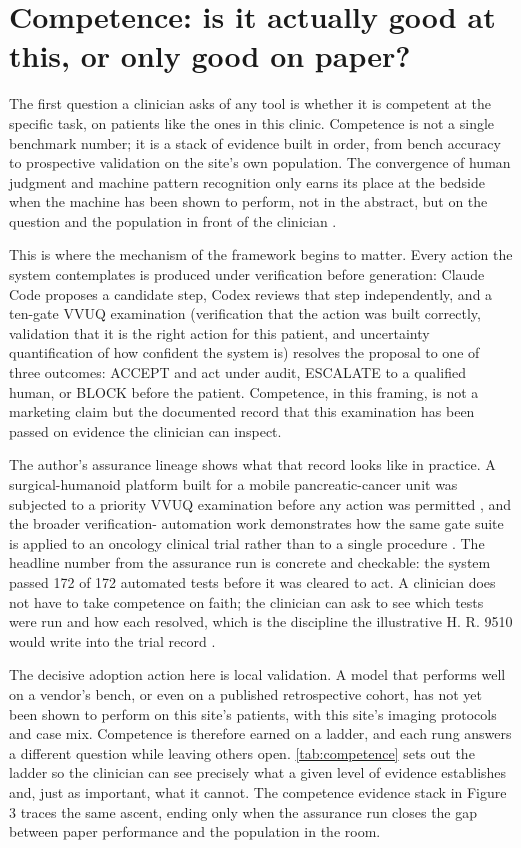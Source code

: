 \section{Competence: is it actually good at this, or only good on paper?}
\label{sec:competence}

The first question a clinician asks of any tool is whether it is competent at the
specific task, on patients like the ones in this clinic. Competence is not a single
benchmark number; it is a stack of evidence built in order, from bench accuracy to
prospective validation on the site's own population. The convergence of human
judgment and machine pattern recognition only earns its place at the bedside when
the machine has been shown to perform, not in the abstract, but on the question and
the population in front of the clinician \cite{topol2019high}.

This is where the mechanism of the framework begins to matter. Every action the
system contemplates is produced under verification before generation: Claude Code
proposes a candidate step, Codex reviews that step independently, and a ten-gate
VVUQ examination (verification that the action was built correctly, validation that
it is the right action for this patient, and uncertainty quantification of how
confident the system is) resolves the proposal to one of three outcomes: ACCEPT
and act under audit, ESCALATE to a qualified human, or BLOCK before the patient.
Competence, in this framing, is not a marketing claim but the documented record
that this examination has been passed on evidence the clinician can inspect.

The author's assurance lineage shows what that record looks like in practice. A
surgical-humanoid platform built for a mobile pancreatic-cancer unit was subjected
to a priority VVUQ examination before any action was permitted
\cite{Kawchak2026MobilePancreaticCancerUnitree}, and the broader verification-
automation work demonstrates how the same gate suite is applied to an oncology
clinical trial rather than to a single procedure
\cite{Kawchak2026VVUQOncologyClinicalTrial}. The headline number from the assurance
run is concrete and checkable: the system passed 172 of 172 automated tests before
it was cleared to act. A clinician does not have to take competence on faith; the
clinician can ask to see which tests were run and how each resolved, which is the
discipline the illustrative H. R. 9510 would write into the trial record
\cite{Kawchak2026HR9510Bill}.

The decisive adoption action here is local validation. A model that performs well
on a vendor's bench, or even on a published retrospective cohort, has not yet been
shown to perform on this site's patients, with this site's imaging protocols and
case mix. Competence is therefore earned on a ladder, and each rung answers a
different question while leaving others open. \autoref{tab:competence} sets out the
ladder so the clinician can see precisely what a given level of evidence
establishes and, just as important, what it cannot. The competence evidence stack
in Figure 3 traces the same ascent, ending only when the assurance run closes the
gap between paper performance and the population in the room.

